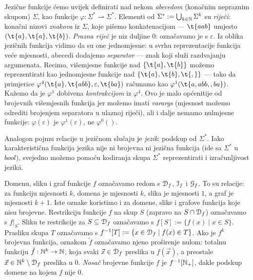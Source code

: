 Jezične funkcije ćemo uvijek definirati nad nekom \emph{abecedom} (konačnim nepraznim skupom) $\Sigma$, kao funkcije $\varphi:\Sigma^*\rightharpoonup\Sigma^*$. Elementi od $\Sigma^*:=\bigcup_{k\in{\mathbb N}}\Sigma^k$ su \emph{riječi}: konačni nizovi \emph{znakova} iz $\Sigma$, koje pišemo konkatenacijom --- $\t{aab}$ umjesto $(\t{a},\t{a},\t{b})$. \emph{Prazna riječ} je niz duljine $0$: označavamo je s $\varepsilon$. Iz oblika jezičnih funkcija vidimo da su one jednomjesne: u svrhu reprezentacije funkcija veće mjesnosti, abecedi dodajemo \emph{separator} --- znak koji služi razdvajanju argumenata. Recimo, višemjesne funkcije nad $\{\t{a},\t{b}\}$ možemo reprezentirati kao jednomjesne funkcije nad $\{\t{a},\t{b},\t{,}\}$ --- tako da primjerice $\varphi^4(\t{a},\t{abb},\varepsilon,\t{ba})$ računamo kao $\varphi^1(\t{a{},{}a{}b{}b{},{},{}b{}a})$. Kažemo da je $\varphi^1$ dobivena \emph{kontrakcijom} iz $\varphi^4$. Ovo je malo općenitije od brojevnih višemjesnih funkcija jer možemo imati \emph{varargs} (mjesnost možemo odrediti brojenjem separatora u ulaznoj ri\-je\-či), ali i dalje nemamo nulmjesne funkcije: $\varphi(\varepsilon)$ je $\varphi^1(\varepsilon)$, ne $\varphi^0()$. %

Analogon pojmu relacije u jezičnom slučaju je \emph{jezik}: podskup od $\Sigma^*$. Iako karakteristična funkcija jezika nije ni brojevna ni jezična funkcija (ide sa $\Sigma^*$ u $bool$), svejedno možemo pomoću kodiranja skupa $\Sigma^*$ reprezentirati i izračunljivost jezik\=a. %

Domenu, sliku i graf funkcije $f$ označavamo redom s $\mathcal D_{f}$, $\mathcal I_{f}$ i $\mathcal G_{f}$. To su relacije: za funkciju mjesnosti $k$, domena je mjesnosti $k$, slika je mjesnosti $1$, a graf je mjesnosti $k+1$. Iste oznake koristimo i za domene, slike i grafove funkcija koje nisu brojevne. Restrikciju funkcije $f$ na skup $S$ (zapravo na $S\cap\mathcal D_{f}$) označavamo s $f|_S$. Sliku te restrikcije za $S\subseteq\mathcal D_{f}$ označavamo s $f[S]:=\{f(x)\mid x\in S\}$. Prasliku skupa $T$ označavamo s $f^{-1}[T]:=\{x\in\mathcal D_{f}\mid f(x)\in T\}$. Ako je $f^k$ brojevna funkcija, oznakom $\tilde f$ označavamo njeno proširenje nulom: totalnu funkciju $\tilde{f}:{\mathbb N}^k\to{\mathbb N}$, koja svaki $\vec x\in\mathcal D_{f}$ preslika u $f(\vec x)$, a preostale $\vec x\in{\mathbb N}^k\setminus\mathcal D_{f}$ preslika u $0$. \emph{Nosač} brojevne funkcije $f$ je $f^{-1}[{\mathbb N}_+]$, dakle podskup domene na kojem $f$ nije $0$.

